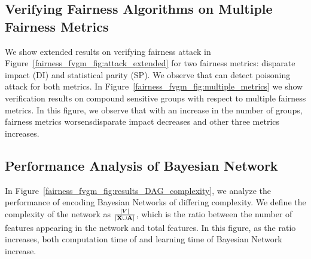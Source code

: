 	\subsection{Verifying Fairness Algorithms on Multiple Fairness Metrics}
	
	We show extended results on verifying fairness attack in Figure~\ref{fairness_fvgm_fig:attack_extended} for two fairness metrics: disparate impact (DI) and statistical parity (SP). We observe that {\fvgm} can detect poisoning attack for both metrics. 	In Figure~\ref{fairness_fvgm_fig:multiple_metrics} we show verification results on compound sensitive groups with respect to multiple fairness metrics. In this figure, we observe that with an increase in the number of groups, fairness metrics worsens\textemdash disparate impact decreases and other three metrics increases.
		
	\subsection{Performance Analysis of Bayesian Network}
	In Figure~\ref{fairness_fvgm_fig:results_DAG_complexity}, we analyze the performance of encoding Bayesian Networks of differing complexity. We define the complexity of the network as  $ \frac{|V|}{|\mathbf{X} \cup \mathbf{A}|} $, which is the ratio between the number of features appearing in the network and total features. In this figure, as the ratio increases, both computation time of {\fvgm} and learning time of Bayesian Network increase. 
	
